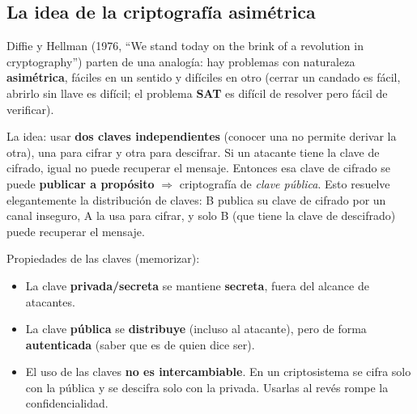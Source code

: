 \documentclass[../main.tex]{subfiles}
\begin{document}
\subsection{La idea de la criptografía asimétrica}

Diffie y Hellman (1976, ``We stand today on the brink of a revolution in
cryptography'') parten de una analogía: hay problemas con naturaleza
\textbf{asimétrica}, fáciles en un sentido y difíciles en otro (cerrar un candado
es fácil, abrirlo sin llave es difícil; el problema \textbf{SAT} es difícil de
resolver pero fácil de verificar).

La idea: usar \textbf{dos claves independientes} (conocer una no permite derivar la
otra), una para cifrar y otra para descifrar. Si un atacante tiene la clave de
cifrado, igual no puede recuperar el mensaje. Entonces esa clave de cifrado se
puede \textbf{publicar a propósito} $\Rightarrow$ criptografía de \emph{clave
pública}. Esto resuelve elegantemente la distribución de claves: B publica su
clave de cifrado por un canal inseguro, A la usa para cifrar, y solo B (que tiene
la clave de descifrado) puede recuperar el mensaje.

\begin{destacado}
Propiedades de las claves (memorizar):
\begin{itemize}[leftmargin=1.4em,nosep]
  \item La clave \textbf{privada/secreta} se mantiene \textbf{secreta}, fuera del
  alcance de atacantes.
  \item La clave \textbf{pública} se \textbf{distribuye} (incluso al atacante),
  pero de forma \textbf{autenticada} (saber que es de quien dice ser).
  \item El uso de las claves \textbf{no es intercambiable}. En un criptosistema se
  cifra solo con la pública y se descifra solo con la privada. Usarlas al revés
  rompe la confidencialidad.
\end{itemize}
\end{destacado}
\end{document}

